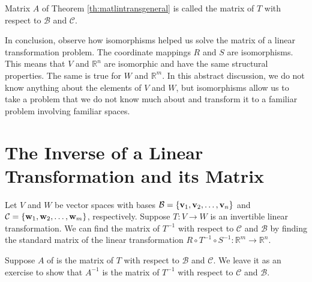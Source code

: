 \documentclass{ximera}
\renewcommand{\vec}[1]{{\bf #1}}
\newcommand{\RR}{\mathbb{R}}
\begin{document}
\begin{definition}\label{def:matlintransgenera}
Matrix $A$ of Theorem \ref{th:matlintransgeneral} is called the matrix of $T$ with respect to $\mathcal{B}$ and $\mathcal{C}$.
\end{definition}

In conclusion, observe how isomorphisms helped us solve the matrix of a linear transformation problem.  The coordinate mappings $R$ and $S$ are isomorphisms.  This means that $V$ and $\RR^n$ are isomorphic and have the same structural properties.  The same is true for $W$ and $\RR^m$.  In this abstract discussion, we do not know anything about the elements of $V$ and $W$, but isomorphisms allow us to take a problem that we do not know much about and transform it to a familiar problem involving familiar spaces.

\section*{The Inverse of a Linear Transformation and its Matrix}

Let $V$ and $W$ be vector spaces with bases $\mathcal{B}=\{\vec{v}_1, \vec{v}_2,\ldots ,\vec{v}_n\}$ and $\mathcal{C}=\{\vec{w}_1, \vec{w}_2,\ldots ,\vec{w}_m\}$, respectively.   Suppose $T:V\rightarrow W$ is an invertible linear transformation.  We can find the matrix of $T^{-1}$ with respect to $\mathcal{C}$ and $\mathcal{B}$ by finding the standard matrix of the linear transformation $R\circ T^{-1}\circ S^{-1}:\RR^m\rightarrow \RR^n$.

\begin{center}
\end{center}

Suppose $A$ of  is  the matrix of $T$ with respect to $\mathcal{B}$ and $\mathcal{C}$.  We leave it as an exercise to show that $A^{-1}$ is the matrix of $T^{-1}$ with respect to $\mathcal{C}$ and $\mathcal{B}$.
\end{document}
